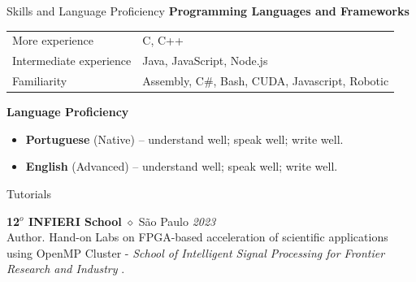 \documentclass[a4paper]{resume}
\begin{document}
\begin{rSection}{Skills and Language Proficiency}
{\bf Programming Languages and Frameworks}

\begin{tabular}{ll}
  More experience & C, C++ \\
  Intermediate experience & Java, JavaScript, Node.js\\
  Familiarity & Assembly, C\#, Bash, CUDA, Javascript, Robotic \\
\end{tabular}


{\bf Language Proficiency}
\begin{itemize}[noitemsep]
  \item {\bf Portuguese} (Native) -- understand well; speak well; write well.
  \item {\bf English} (Advanced) -- understand well; speak well; write well.
\end{itemize}
\end{rSection}

\begin{rSection}{Tutorials}

{\bf 12$^o$ INFIERI School} $\diamond$ São Paulo \hfill {\em 2023} \\
Author. Hand-on Labs on FPGA-based acceleration of scientific applications using OpenMP Cluster - \textit{School of Intelligent Signal Processing for Frontier Research and Industry }.

\end{rSection}
\end{document}
